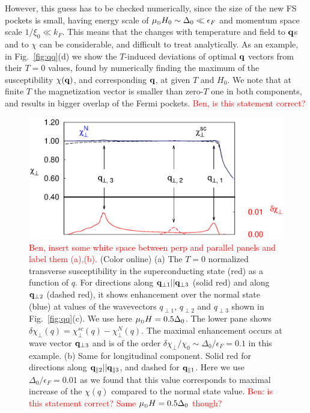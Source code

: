 \documentclass[aps,prl,twocolumn,showpacs,amsmath,amssymb]{revtex4-1}
\newcommand{\red}{\textcolor{red}}
\begin{document}
However, this guess has to be checked numerically, 
since the size of the new FS pockets is small, having energy scale of 
$\mu_{\mbox{\tiny B}}H_0 \sim \Delta_0 \ll \epsilon_F$ 
and momentum space scale $1/\xi_0 \ll k_F$. This means that the changes with temperature 
and field to ${\bf q}$s and to $\chi$ can be considerable, and difficult to treat 
analytically. 
As an example, in Fig.~\ref{fig:qq}(d) 
we show the $T$-induced deviations of optimal ${\bf q}$ vectors from their $T=0$ values, 
found by numerically finding the maximum of the susceptibility $\chi({\bf q})$, 
and corresponding ${\bf q}$, at given $T$ and $H_0$. 
We note that at finite $T$ the magnetization vector is smaller than zero-$T$ one in 
both components, and results in bigger overlap of the Fermi pockets. 
\red{Ben, is this statement correct?}

\begin{figure}[t]
\includegraphics[width=0.95\linewidth]{Fig3.eps}
\caption{
	\label{fig:chi_enh}
	\red{Ben, insert some white space between perp and parallel panels and label them (a),(b).} 
	(Color online)
	(a) The $T=0$ normalized transverse susceptibility in the superconducting
state (red) as a function of $q$. For directions along ${\bf q}_{\perp 1} || {\bf q}_{\perp 3}$ (solid red) 
and along ${\bf q}_{\perp 2}$ (dashed red), it shows enhancement over 
the normal state (blue) at values of the wavevectors 
$q_{\perp1}$, $q_{\perp 2}$ and $q_{\perp 3}$ shown in Fig.~\ref{fig:qq}(c). 
We use here  $\mu_{\mbox{\tiny B}} H = 0.5\Delta_0$. 
The lower pane shows $\delta\chi_\perp(q) = \chi_\perp^{sc}(q) - \chi_\perp^{N}(q)$. 
The maximal enhancement occurs at wave vector ${\bf q}_{\perp 3}$ and is of the 
order $\delta \chi_\perp/\chi_0 \sim \Delta_0/\epsilon_F = 0.1$ in this example. 
%
(b) Same for longitudinal component. 
Solid red for directions along ${\bf q}_{\parallel 2} || {\bf q}_{\parallel 3}$, and dashed for ${\bf q}_{\parallel 1}$.  
Here we use $\Delta_0/\epsilon_F = 0.01$ 
as we found that this value corresponds to maximal increase of the $\chi(q)$ compared 
to the normal state value. 
\red{Ben: is this statement correct? Same $\mu_{\mbox{\tiny B}} H = 0.5\Delta_0$ though?} 
}
 \end{figure}
  
\end{document}
